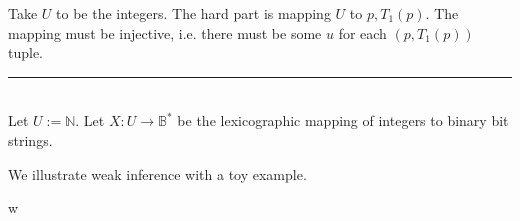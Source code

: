 \documentclass[11pt]{article}
\newcommand{\N}{\mathbb{N}}
\newcommand{\B}{\mathbb{B}}
\begin{document}
Take $ U $ to be the integers. The hard part is mapping $ U $ to $ p, T_{1}(p) $. The mapping must be injective, i.e. there must be some $ u $ for each $(p, T_{1}(p))$ tuple. \\



\noindent\rule{16cm}{0.4pt} \\
Let $ U := \N $. Let $ X: U \rightarrow \B^{*} $ be the lexicographic mapping of integers to binary bit strings. 

We illustrate weak inference with a toy example. 

w







\end{document}
